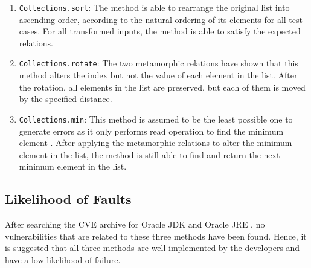 \documentclass[12pt, a4paper]{article}
\begin{document}
\begin{enumerate}
  \item \texttt{Collections.sort}: The method is able to rearrange the original list into ascending
  order, according to the natural ordering of its elements for all test cases. For all transformed
  inputs, the method is able to satisfy the expected relations.

  \item \texttt{Collections.rotate}: The two metamorphic relations have shown that this method
  alters the index but not the value of each element in the list. After the rotation, all elements
  in the list are preserved, but each of them is moved by the specified distance.

  \item \texttt{Collections.min}: This method is assumed to be the least possible one to generate
  errors as it only performs read operation to find the minimum element \cite{collection_min}. After
  applying the metamorphic relations to alter the minimum element in the list, the method is still
  able to find and return the next minimum element in the list.
\end{enumerate}

\subsection{Likelihood of Faults}
After searching the CVE archive for Oracle JDK \cite{jdk_cve} and Oracle JRE \cite{jre_cve}, no
vulnerabilities that are related to these three methods have been found. Hence, it is suggested that
all three methods are well implemented by the developers and have a low likelihood of failure.

\printbibliography
\end{document}
